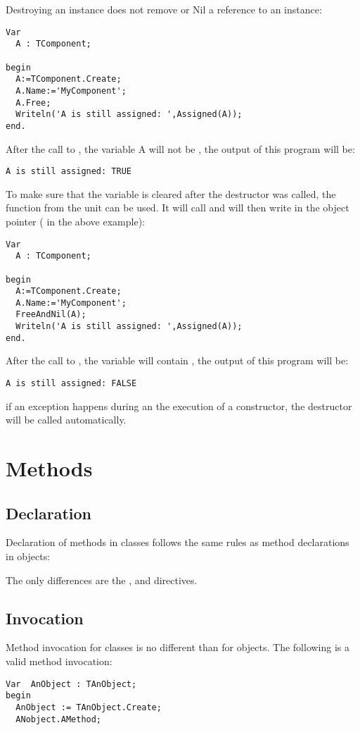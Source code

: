 Destroying an instance does not remove or Nil a reference to an instance:
\begin{verbatim}
Var
  A : TComponent;

begin
  A:=TComponent.Create;
  A.Name:='MyComponent';
  A.Free;
  Writeln('A is still assigned: ',Assigned(A));
end.
\end{verbatim}
After the call to , the variable A will not be , the
output of this program will be:
\begin{verbatim}
A is still assigned: TRUE
\end{verbatim}
To make sure that the variable  is cleared after the destructor was called,
the function  from the  unit can be used. It
will call  and will then write  in the object pointer (
in the above example):
\begin{verbatim}
Var
  A : TComponent;

begin
  A:=TComponent.Create;
  A.Name:='MyComponent';
  FreeAndNil(A);
  Writeln('A is still assigned: ',Assigned(A));
end.
\end{verbatim}
After the call to , the variable  will contain , the
output of this program will be:
\begin{verbatim}
A is still assigned: FALSE
\end{verbatim}

\begin{remark}
if an exception happens during an the execution of a constructor,
the destructor will be called automatically.
\end{remark}

\section{Methods}
\subsection{Declaration}
Declaration of methods in classes follows the same rules as method
declarations in objects:

The only differences are the ,  and
 directives.

\subsection{Invocation}
Method invocation for classes is no different than for objects. The
following is a valid method invocation:
\begin{verbatim}
Var  AnObject : TAnObject;
begin
  AnObject := TAnObject.Create;
  ANobject.AMethod;
\end{verbatim}


